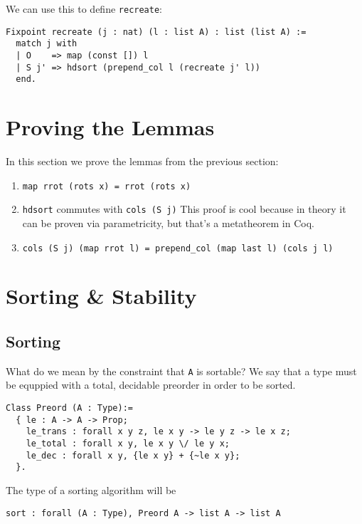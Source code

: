 \documentclass[11pt]{article}
\begin{document}
We can use this to define \verb|recreate|:
\begin{verbatim}
Fixpoint recreate (j : nat) (l : list A) : list (list A) :=
  match j with
  | O    => map (const []) l
  | S j' => hdsort (prepend_col l (recreate j' l))
  end.
\end{verbatim}

\section{Proving the Lemmas}
\label{sec:lemmas}

In this section we prove the lemmas from the previous section:
\begin{enumerate}
\item
\begin{verbatim}
map rrot (rots x) = rrot (rots x)
\end{verbatim}

\item \verb|hdsort| commutes with \verb|cols (S j)|
  This proof is cool because in theory it can be proven via
  parametricity, but that's a metatheorem in Coq.

\item
\begin{verbatim}
cols (S j) (map rrot l) = prepend_col (map last l) (cols j l)
\end{verbatim}
\end{enumerate}

\section{Sorting \& Stability}
\label{sec:sort_stable}

\subsection{Sorting}
\label{subsec:sorting}
What do we mean by the constraint that \verb|A| is sortable? We say
that a type must be equppied with a total, decidable preorder in order
to be sorted.
\begin{verbatim}
Class Preord (A : Type):=
  { le : A -> A -> Prop;
    le_trans : forall x y z, le x y -> le y z -> le x z;
    le_total : forall x y, le x y \/ le y x;
    le_dec : forall x y, {le x y} + {~le x y};
  }.
\end{verbatim}
The type of a sorting algorithm will be
\begin{verbatim}
sort : forall (A : Type), Preord A -> list A -> list A
\end{verbatim}
\end{document}
